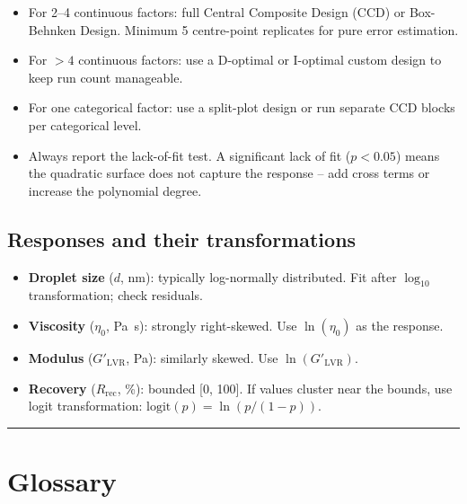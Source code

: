 \documentclass[11pt,a4paper]{article}
\begin{document}
\begin{itemize}[leftmargin=1.6em,itemsep=3pt]
\item For 2--4 continuous factors: full Central Composite Design (CCD)
  or Box-Behnken Design. Minimum 5 centre-point replicates for pure
  error estimation.
\item For $>4$ continuous factors: use a D-optimal or I-optimal custom
  design to keep run count manageable.
\item For one categorical factor: use a split-plot design or run separate
  CCD blocks per categorical level.
\item Always report the lack-of-fit test. A significant lack of fit
  ($p<0.05$) means the quadratic surface does not capture the response
  -- add cross terms or increase the polynomial degree.
\end{itemize}

\subsection{Responses and their transformations}

\begin{itemize}[leftmargin=1.6em,itemsep=2pt]
\item \textbf{Droplet size} ($d$, nm): typically log-normally distributed.
  Fit after $\log_{10}$ transformation; check residuals.
\item \textbf{Viscosity} ($\eta_0$, \si{\Pa\s}): strongly right-skewed.
  Use $\ln(\eta_0)$ as the response.
\item \textbf{Modulus} ($G'_\mathrm{LVR}$, \si{\Pa}): similarly skewed.
  Use $\ln(G'_\mathrm{LVR})$.
\item \textbf{Recovery} ($R_\mathrm{rec}$, \%): bounded [0, 100].
  If values cluster near the bounds, use logit transformation:
  $\mathrm{logit}(p)=\ln(p/(1-p))$.
\end{itemize}

\bigskip\hrule\bigskip

\appendix

\section{Glossary}
\label{app:glossary}
\end{document}
